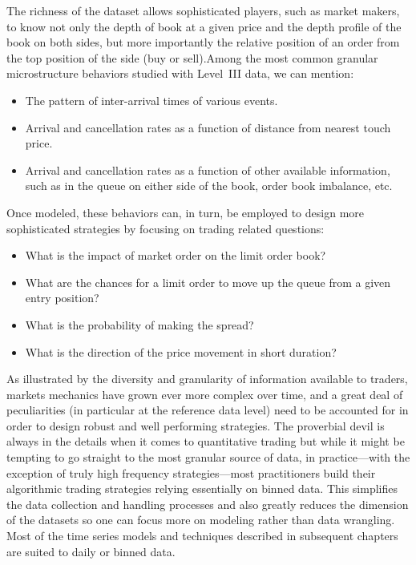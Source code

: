 The richness of the dataset allows sophisticated players, such as market makers, to know not only the depth of book at a given price and the depth profile of the book on both sides, but more importantly the relative position of an order from the top position of the side (buy or sell).Among the most common granular microstructure behaviors studied with Level~III data, we can mention:
        \begin{itemize}
        \item The pattern of inter-arrival times of various events.
        \item Arrival and cancellation rates as a function of distance from nearest touch price.
        \item Arrival and cancellation rates as a function of other available information, such as in the queue on either side of the book, order book imbalance, etc.
        \end{itemize}
Once modeled, these behaviors can, in turn, be employed to design more sophisticated strategies by focusing on trading related questions:
        \begin{itemize}
        \item What is the impact of market order on the limit order book?
        \item What are the chances for a limit order to move up the queue from a given entry position?
        \item What is the probability of making the spread?
        \item What is the direction of the price movement in short duration?
        \end{itemize}


As illustrated by the diversity and granularity of information available to traders, markets mechanics have grown ever more complex over time, and a great deal of peculiarities (in particular at the reference data level) need to be accounted for in order to design robust and well performing strategies. The proverbial devil is always in the details when it comes to quantitative trading but while it might be tempting to go straight to the most granular source of data, in practice---with the exception of truly high frequency strategies---most practitioners build their algorithmic trading strategies relying essentially on binned data. This simplifies the data collection and handling processes and also greatly reduces the dimension of the datasets so one can focus more on modeling rather than data wrangling. Most of the time series models and techniques described in subsequent chapters are suited to daily or binned data.




